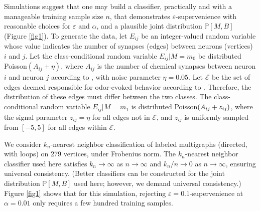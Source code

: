 \documentclass{article}
\newcommand{\PP}{\mathbb{P}}           %
\newcommand{\eps}{\varepsilon}
\providecommand{\mc}[1]{\mathcal{#1}}
\providecommand{\tr}[1]{\textcolor{black}{#1}}
\begin{document}
Simulations suggest that one may build a classifier, practically and with a manageable training sample size $n$, that demonstrates $\varepsilon$-supervenience with reasonable choices for $\varepsilon$ and $\alpha$, and a plausible joint distribution $\PP[M,B]$ (Figure \ref{fig1}). To generate the data, let $E_{ij}$ be an integer-valued random variable whose value indicates the number of synapses (edges) between neurons (vertices) $i$ and $j$.  Let the class-conditional random variable $E_{ij} | M=m_0$  be distributed Poisson$(A_{ij}+\eta)$, where $A_{ij}$ is the number of chemical synapses between neuron $i$ and neuron $j$ according to \cite{VarshneyChklovskii09}, with noise parameter $\eta=0.05$.  Let $\mc{E}$ be the set of edges deemed responsible for odor-evoked behavior according to \cite{ChalasaniBargmann07}.  Therefore, the distribution of these edges must differ between the two classes.  The class-conditional random variable $E_{ij} | M=m_1$ is distributed Poisson$(A_{ij}+ \tr{z_{ij}})$, where the signal parameter $z_{ij}=\eta$ for all edges not in $\mc{E}$, and $z_{ij}$ is uniformly sampled from $[-5,5]$ for all edges within $\mc{E}$.

We consider $k_n$-nearest neighbor classification of labeled multigraphs (directed, with loops) on 279 vertices, under Frobenius norm. The $k_n$-nearest neighbor classifier used here satisfies $k_n \rightarrow \infty$ as $n \rightarrow \infty$ and $k_n/n \rightarrow 0$ as $n \rightarrow \infty$, ensuring universal consistency. (Better classifiers can be constructed for the joint distribution $\PP[M,B]$ used here; however, we demand universal consistency.)  Figure \ref{fig1} shows that for this simulation, rejecting $\eps=0.1$-supervenience at $\alpha=0.01$ only requires a few hundred training samples.
\end{document}
